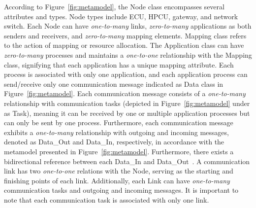     According to Figure~\ref{fig:metamodel}, the Node class encompasses several attributes and types. Node types include ECU, HPCU, gateway, and network switch. Each Node can have \textit{one-to-many} links, \textit{zero-to-many} applications as both senders and receivers, and \textit{zero-to-many} mapping elements. Mapping class refers to the action of mapping or resource allocation.
    The Application class can have \textit{zero-to-many} processes and maintains a \textit{one-to-one} relationship with the Mapping class, signifying that each application has a unique mapping attribute. Each process is associated with only one application, and each application process can send/receive only one communication message indicated as Data class in Figure~\ref{fig:metamodel}.
    Each communication message consists of a \textit{one-to-many} relationship with communication tasks (depicted in Figure~\ref{fig:metamodel} under as Task), meaning it can be received by one or multiple application processes but can only be sent by one process.
    Furthermore, each communication message exhibits a \textit{one-to-many} relationship with outgoing and incoming messages, denoted as Data\_Out and Data\_In, respectively, in accordance with the metamodel presented in Figure~\ref{fig:metamodel}. Furthermore, there exists a bidirectional reference between each Data\_In and Data\_Out~\cite{9565115}.
    A communication link has two \textit{one-to-one} relations with the Node, serving as the starting and finishing points of each link. Additionally, each Link can have \textit{one-to-many} communication tasks and outgoing and incoming messages. It is important to note that each communication task is associated with only one link.
